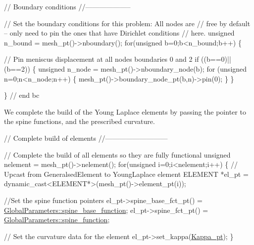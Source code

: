 \begin{DoxyCodeInclude}
 \textcolor{comment}{// Boundary conditions}
 \textcolor{comment}{//--------------------}

 \textcolor{comment}{// Set the boundary conditions for this problem: All nodes are}
 \textcolor{comment}{// free by default -- only need to pin the ones that have Dirichlet conditions}
 \textcolor{comment}{// here. }
 \textcolor{keywordtype}{unsigned} n\_bound = mesh\_pt()->nboundary(); 
 \textcolor{keywordflow}{for}(\textcolor{keywordtype}{unsigned} b=0;b<n\_bound;b++)
  \{

   \textcolor{comment}{// Pin meniscus displacement at all nodes boundaries  0 and 2}
   \textcolor{keywordflow}{if} ((b==0)||(b==2))
    \{
     \textcolor{keywordtype}{unsigned} n\_node = mesh\_pt()->nboundary\_node(b);
     \textcolor{keywordflow}{for} (\textcolor{keywordtype}{unsigned} n=0;n<n\_node;n++)
      \{
       mesh\_pt()->boundary\_node\_pt(b,n)->pin(0); 
      \}
    \}

  \} \textcolor{comment}{// end bc}

\end{DoxyCodeInclude}


We complete the build of the Young Laplace elements by passing the pointer to the spine functions, and the prescribed curvature.


\begin{DoxyCodeInclude}
 
 \textcolor{comment}{// Complete build of elements}
 \textcolor{comment}{//---------------------------}

 \textcolor{comment}{// Complete the build of all elements so they are fully functional }
 \textcolor{keywordtype}{unsigned} nelement = mesh\_pt()->nelement();
 \textcolor{keywordflow}{for}(\textcolor{keywordtype}{unsigned} i=0;i<nelement;i++)
  \{
   \textcolor{comment}{// Upcast from GeneralsedElement to YoungLaplace element}
   ELEMENT *el\_pt = \textcolor{keyword}{dynamic\_cast<}ELEMENT*\textcolor{keyword}{>}(mesh\_pt()->element\_pt(i));

   \textcolor{comment}{//Set the spine function pointers}
   el\_pt->spine\_base\_fct\_pt() = \hyperlink{namespaceGlobalParameters_ac81daf87f8d3f075d9fd108427e70c4f}{GlobalParameters::spine\_base\_function};
   el\_pt->spine\_fct\_pt() =  \hyperlink{namespaceGlobalParameters_a82df8c67f58e78a236fb6a0cc8bf8284}{GlobalParameters::spine\_function};
  
   \textcolor{comment}{// Set the curvature data for the element}
   el\_pt->set\_kappa(\hyperlink{namespaceGlobalParameters_ac6234184cce40ab2c6bec92b37e4ae41}{Kappa\_pt}); 
  \}

\end{DoxyCodeInclude}


